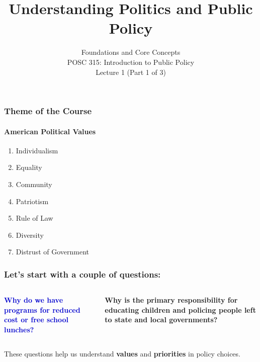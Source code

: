 \documentclass[10pt]{beamer}
\begin{document}
\title{Understanding Politics and Public Policy}
\subtitle{Foundations and Core Concepts\\POSC 315: Introduction to Public Policy\\Lecture 1 (Part 1 of 3)}
\date{}

\maketitle

\begin{frame}
\frametitle{Theme of the Course}
\framesubtitle{American Political Values}

\begin{block}{}
\begin{enumerate}
\item Individualism
\item Equality
\item Community
\item Patriotism
\item Rule of Law
\item Diversity
\item Distrust of Government
\end{enumerate}
\end{block}

\end{frame}

\begin{frame}
\frametitle{Let's start with a couple of questions:}

\begin{columns}
\begin{column}{0.48\textwidth}
\begin{block}{}
\centering
\textcolor{mediumblue}{\textbf{Why do we have programs for reduced cost or free school lunches?}}
\end{block}
\end{column}

\begin{column}{0.48\textwidth}
\begin{block}{}
\centering
\textcolor{titanblue}{\textbf{Why is the primary responsibility for educating children and policing people left to state and local governments?}}
\end{block}
\end{column}
\end{columns}

\vspace{1cm}
\pause
\centering
These questions help us understand \textbf{values} and \textbf{priorities} in policy choices.

\end{frame}
\end{document}
